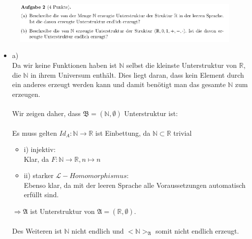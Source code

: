 \documentclass[a4paper]{scrartcl}
\begin{document}
\section*{}%
\label{sec:aufgabe_2}

\begin{figure}[H]
    \centering
    \includegraphics[scale=0.6]{./A-2.png}
    \label{fig:}
\end{figure}

\begin{itemize}
    \item a)\\
        Da wir keine Funktionen haben ist $\mathds{N}$ selbst die kleinste Unterstruktur von $\mathds{R}$, die $\mathds{N}$ in ihrem Universum enthält.
        Dies liegt daran, dass kein Element durch ein anderes erzeugt werden kann und damit benötigt man das gesamte $\mathds{N}$ zum erzeugen.\\
        \\Wir zeigen daher, dass $\mathfrak{B} = (\mathds{N}, \emptyset)$ Unterstruktur ist:\\
        \\Es muss gelten $Id_A: \mathds{N} \rightarrow \mathds{R}$ ist Einbettung, da $\mathds{N} \subset \mathds{R}$ trivial
        \begin{itemize}
            \item i) injektiv:\\
                Klar, da $F: \mathds{N} \rightarrow \mathds{R}, n \mapsto n$
            \item ii) starker $\mathscr{L}-Homomorphismus$:\\
                Ebenso klar, da mit der leeren Sprache alle Voraussetzungen automatisch erfüllt sind.
        \end{itemize}
        $\Rightarrow \mathfrak{A}$ ist Unterstruktur von $\mathfrak{A} = (\mathds{R}, \emptyset)$.\\

        \\Des Weiteren ist $\mathds{N}$ nicht endlich und $<\mathds{N}>_\mathfrak{A}$ somit nicht endlich erzeugt.\\


\end{itemize}
\end{document}
